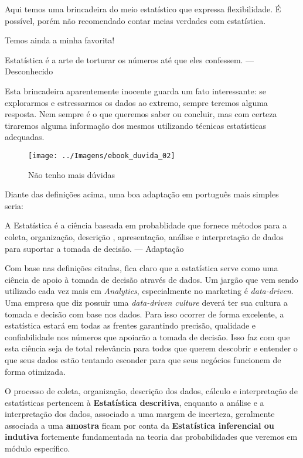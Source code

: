 \documentclass[11pt,]{style/krantz}
\renewenvironment{quote}{\begin{VF}}{\end{VF}}
\theoremstyle{definition}
\theoremstyle{definition}
\theoremstyle{definition}
\theoremstyle{remark}
\begin{document}
Aqui temos uma brincadeira do meio estatístico que expressa flexibilidade. É possível, porém não recomendado contar meias verdades com estatística.

Temos ainda a minha favorita!

\begin{quote}
Estatística é a arte de torturar os números até que eles confessem. --- Desconhecido
\end{quote}

Esta brincadeira aparentemente inocente guarda um fato interessante: se explorarmos e estressarmos os dados ao extremo, sempre teremos alguma resposta. Nem sempre é o que queremos saber ou concluir, mas com certeza tiraremos alguma informação dos mesmos utilizando técnicas estatísticas adequadas.

\begin{figure}[H]

{\centering \texttt{[image: ../Imagens/ebook\_duvida\_02]} 

}

\caption{Não tenho mais dúvidas}\label{fig:fig02}
\end{figure}

Diante das definições acima, uma boa adaptação em português mais simples seria:

\begin{quote}
A Estatística é a ciência baseada em probablidade que fornece métodos para a coleta, organização, descrição , apresentação, análise e interpretação de dados para suportar a tomada de decisão. --- Adaptação
\end{quote}

Com base nas definições citadas, fica claro que a estatística serve como uma ciência de apoio à tomada de decisão através de dados. Um jargão que vem sendo utilizado cada vez mais em \emph{Analytics}, especialmente no marketing é \emph{data-driven}. Uma empresa que diz possuir uma \emph{data-driven culture} deverá ter sua cultura a tomada e decisão com base nos dados. Para isso ocorrer de forma excelente, a estatística estará em todas as frentes garantindo precisão, qualidade e confiabilidade nos números que apoiarão a tomada de decisão. Isso faz com que esta ciência seja de total relevância para todos que querem descobrir e entender o que seus dados estão tentando esconder para que seus negócios funcionem de forma otimizada.

O processo de coleta, organização, descrição dos dados, cálculo e interpretação de estatísticas pertencem à \textbf{Estatística descritiva}, enquanto a análise e a interpretação dos dados, associado a uma margem de incerteza, geralmente associada a uma \textbf{amostra} ficam por conta da \textbf{Estatística inferencial ou indutiva} fortemente fundamentada na teoria das probabilidades que veremos em módulo específico.
\end{document}
